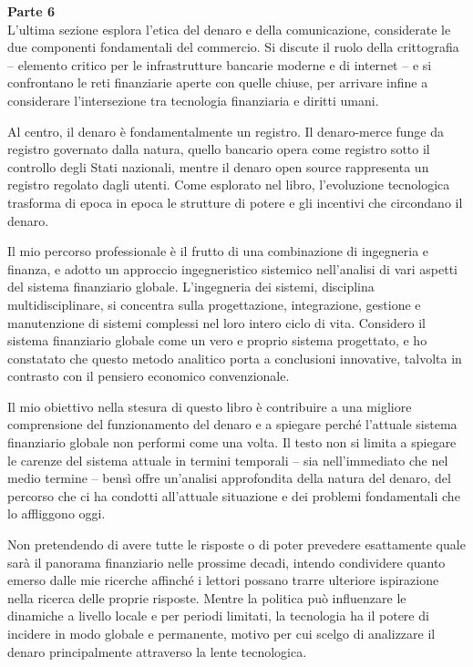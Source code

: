 \documentclass[
  a5paper,
  smalldemyvopaper,10pt,twoside,onecolumn,openright,extrafontsizes,hidelinks]{memoir}
\begin{document}
\textbf{Parte 6}\\
L'ultima sezione esplora l'etica del denaro e della comunicazione,
considerate le due componenti fondamentali del commercio. Si discute il
ruolo della crittografia -- elemento critico per le infrastrutture
bancarie moderne e di internet -- e si confrontano le reti finanziarie
aperte con quelle chiuse, per arrivare infine a considerare
l'intersezione tra tecnologia finanziaria e diritti umani.

Al centro, il denaro è fondamentalmente un registro. Il denaro-merce
funge da registro governato dalla natura, quello bancario opera come
registro sotto il controllo degli Stati nazionali, mentre il denaro open
source rappresenta un registro regolato dagli utenti. Come esplorato nel
libro, l'evoluzione tecnologica trasforma di epoca in epoca le strutture
di potere e gli incentivi che circondano il denaro.

Il mio percorso professionale è il frutto di una combinazione di
ingegneria e finanza, e adotto un approccio ingegneristico sistemico
nell'analisi di vari aspetti del sistema finanziario globale.
L'ingegneria dei sistemi, disciplina multidisciplinare, si concentra
sulla progettazione, integrazione, gestione e manutenzione di sistemi
complessi nel loro intero ciclo di vita. Considero il sistema
finanziario globale come un vero e proprio sistema progettato, e ho
constatato che questo metodo analitico porta a conclusioni innovative,
talvolta in contrasto con il pensiero economico convenzionale.

Il mio obiettivo nella stesura di questo libro è contribuire a una
migliore comprensione del funzionamento del denaro e a spiegare perché
l'attuale sistema finanziario globale non performi come una volta. Il
testo non si limita a spiegare le carenze del sistema attuale in termini
temporali -- sia nell'immediato che nel medio termine -- bensì offre
un'analisi approfondita della natura del denaro, del percorso che ci ha
condotti all'attuale situazione e dei problemi fondamentali che lo
affliggono oggi.

Non pretendendo di avere tutte le risposte o di poter prevedere
esattamente quale sarà il panorama finanziario nelle prossime decadi,
intendo condividere quanto emerso dalle mie ricerche affinché i lettori
possano trarre ulteriore ispirazione nella ricerca delle proprie
risposte. Mentre la politica può influenzare le dinamiche a livello
locale e per periodi limitati, la tecnologia ha il potere di incidere in
modo globale e permanente, motivo per cui scelgo di analizzare il denaro
principalmente attraverso la lente tecnologica.
\end{document}
